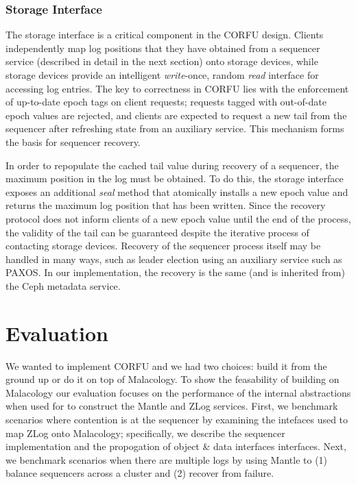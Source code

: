 \documentclass[preprint]{sigplanconf-eurosys}
\begin{document}
\subsubsection{Storage Interface}

The storage interface is a critical component in the CORFU design. Clients
independently map log positions that they have obtained from a sequencer
service (described in detail in the next section) onto storage devices, while
storage devices provide an intelligent \emph{write}-once, random \emph{read}
interface for accessing log entries. The key to correctness in CORFU lies with
the enforcement of up-to-date epoch tags on client requests; requests tagged
with out-of-date epoch values are rejected, and clients are expected to
request a new tail from the sequencer after refreshing state from an auxiliary
service.  This mechanism forms the basis for sequencer recovery.

In order to repopulate the cached tail value during recovery of a sequencer,
the maximum position in the log must be obtained. To do this, the storage
interface exposes an additional \emph{seal} method that atomically installs a
new epoch value and returns the maximum log position that has been written.
Since the recovery protocol does not inform clients of a new epoch value until
the end of the process, the validity of the tail can be guaranteed despite the
iterative process of contacting storage devices.  Recovery of the sequencer
process itself may be handled in many ways, such as leader election using an
auxiliary service such as PAXOS. In our implementation, the recovery is the
same (and is inherited from) the Ceph metadata service.

\section{Evaluation}
\label{sec:evaluation} 

We wanted to implement CORFU and we had two choices: build it from the ground
up or do it on top of Malacology. To show the feasability of building on
Malacology our evaluation focuses on the performance of the internal
abstractions when used for to construct the Mantle and ZLog services. First, we
benchmark scenarios where contention is at the sequencer by examining the
intefaces used to map ZLog onto Malacology; specifically, we describe the
sequencer implementation and the propogation of object \& data interfaces
interfaces. Next, we benchmark scenarios when there are multiple logs by using
Mantle to (1) balance sequencers across a cluster and (2) recover from failure.
\end{document}
